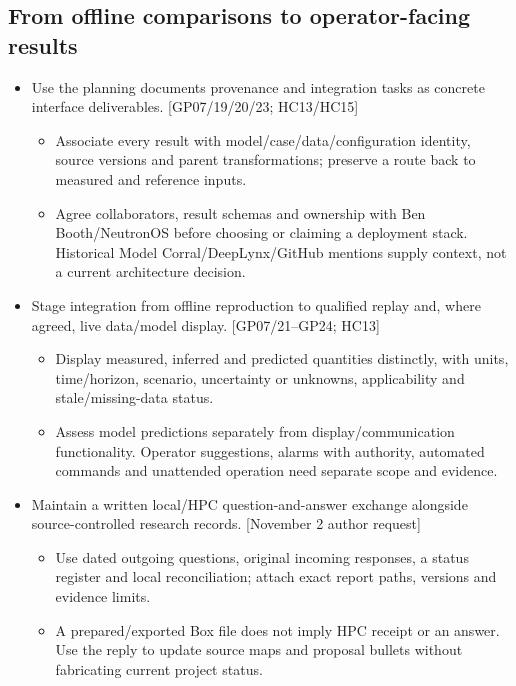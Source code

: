 \subsection{From offline comparisons to operator-facing results}
\begin{itemize}[leftmargin=*]
\item Use the planning document\textquotesingle{}s provenance and integration tasks as concrete interface deliverables. [GP07/19/20/23; HC13/HC15]
\begin{itemize}
\item Associate every result with model/case/data/configuration identity, source versions and parent transformations; preserve a route back to measured and reference inputs.
\item Agree collaborators, result schemas and ownership with Ben Booth/NeutronOS before choosing or claiming a deployment stack. Historical Model Corral/DeepLynx/GitHub mentions supply context, not a current architecture decision.
\end{itemize}
\item Stage integration from offline reproduction to qualified replay and, where agreed, live data/model display. [GP07/21--GP24; HC13]
\begin{itemize}
\item Display measured, inferred and predicted quantities distinctly, with units, time/horizon, scenario, uncertainty or unknowns, applicability and stale/missing-data status.
\item Assess model predictions separately from display/communication functionality. Operator suggestions, alarms with authority, automated commands and unattended operation need separate scope and evidence.
\end{itemize}
\item Maintain a written local/HPC question-and-answer exchange alongside source-controlled research records. [November 2 author request]
\begin{itemize}
\item Use dated outgoing questions, original incoming responses, a status register and local reconciliation; attach exact report paths, versions and evidence limits.
\item A prepared/exported Box file does not imply HPC receipt or an answer. Use the reply to update source maps and proposal bullets without fabricating current project status.
\end{itemize}
\end{itemize}
